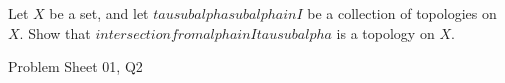 \begin{samepage}
\begin{ex}
Let $X$ be a set, and let $ {{ tau sub alpha }} sub { alpha in I } $ be a collection of topologies on $X$. 
Show that $ intersection from {alpha in I} tau sub alpha $ is a topology on $X$.
\end{ex}
\begin{source}
Problem Sheet 01, Q2
\end{source}
\end{samepage}

